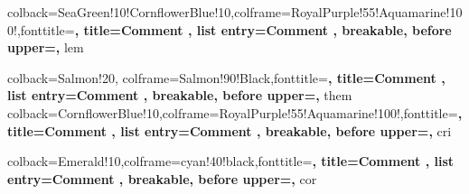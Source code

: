 {
    colback=SeaGreen!10!CornflowerBlue!10,colframe=RoyalPurple!55!Aquamarine!100!,fonttitle=\bfseries, title={Comment \thetcbcounter}, list entry={Comment \thetcbcounter\quad}, %
    breakable, %
    before upper={\parindent10pt\noindent},  %
}
{lem}


{
    colback=Salmon!20, colframe=Salmon!90!Black,fonttitle=\bfseries, title={Comment \thetcbcounter}, list entry={Comment \thetcbcounter\quad}, %
    breakable, %
    before upper={\parindent10pt\noindent},  %
}
{them}
{
    colback=CornflowerBlue!10,colframe=RoyalPurple!55!Aquamarine!100!,fonttitle=\bfseries, title={Comment \thetcbcounter}, list entry={Comment \thetcbcounter\quad}, %
    breakable, %
    before upper={\parindent10pt\noindent},  %
}
{cri}

{
    colback=Emerald!10,colframe=cyan!40!black,fonttitle=\bfseries, title={Comment \thetcbcounter}, list entry={Comment \thetcbcounter\quad}, %
    breakable, %
    before upper={\parindent10pt\noindent},  %
}
{cor}

